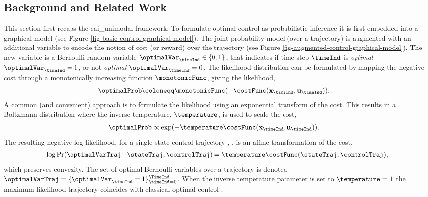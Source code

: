 \documentclass{mimosis-class/mimosis}
\numberwithin{equation}{chapter}
\newcommand{\state}{\ensuremath{\mathbf{x}}}
\newcommand{\control}{\ensuremath{\mathbf{u}}}
\begin{document}
{\subsection{Background and Related Work \label{sec-inference-background}}
\label{sec:orgb25d440}
This section first recaps the \acrfull{cai_unimodal} framework.
To formulate optimal control as probabilistic inference
it is first embedded into a graphical model (see Figure \ref{fig-basic-control-graphical-model}).
The joint probability model (over a trajectory) is augmented with an
additional variable to encode the notion of cost (or reward)
over the trajectory (see Figure \ref{fig-augmented-control-graphical-model}).
The new variable is a Bernoulli random variable \(\optimalVar_\timeInd \in \{0, 1\}\), that indicates if
time step \(\timeInd\) is \emph{optimal} \(\optimalVar_\timeInd=1\), or not \emph{optimal} \(\optimalVar_\timeInd=0\).
The likelihood distribution can be formulated by mapping the negative
cost through a monotonically increasing function \(\monotonicFunc\),
giving the likelihood,
\begin{align} \label{eq-monotonicOptimalityLikelihood}
\optimalProb &\coloneqq \monotonicFunc( -\costFunc(\state_\timeInd, \control_\timeInd)).
\end{align}
A common (and convenient) approach is to formulate
the likelihood using an exponential transform of
the cost. This results in a Boltzmann distribution where the
inverse temperature, \(\temperature\), is used to scale the cost,
\begin{align} \label{eq-exponentialOptimalityLikelihood}
\optimalProb &\propto \exp ( -\temperature\costFunc(\state_\timeInd, \control_\timeInd)).
\end{align}
The resulting negative log-likelihood,
for a single state-control trajectory \stateTraj, \controlTraj,
is an affine transformation of the cost,
\begin{align} \label{eq-negative-log-likelihood-cost}
-\log \Pr(\optimalVarTraj \mid \stateTraj, \controlTraj)
&=  \temperature\costFunc(\stateTraj, \controlTraj),
\end{align}
which preserves convexity.
The set of optimal Bernoulli variables over a trajectory is denoted
\(\optimalVarTraj = \{\optimalVar_{\timeInd}=1\}_{\timeInd=0}^{\TimeInd}\).
When the inverse temperature parameter is set to \(\temperature=1\) the maximum likelihood
trajectory coincides with classical optimal control \citep{toussaintRobot2009}.
\begin{figure}[t]
  \centering
  \begin{subfigure}{.48\textwidth}
  \centering
   \resizebox{0.93\columnwidth}{!}{
    \begin{tikzpicture}[
      pre/.style={<-,shorten <=0.4pt,>=stealth',semithick},
      post/.style={->,shorten >=0.4pt,>=stealth',semithick}
      ]
      \node[obs] (x1) {$\state_0$};
      \node[latent, right=of x1] (x2) {$\state_1$};
      \node[latent, right=of x2] (x3) {$\state_2$};
      \node[latent, right=of x3] (x4) {$\state_3$};


\end{tikzpicture}}
\end{subfigure}
\end{figure}}
\end{document}
